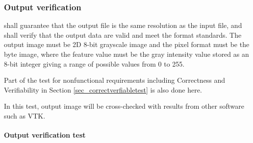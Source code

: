 \documentclass[12pt, titlepage]{article}
\begin{document}
\subsubsection{Output verification} \label{sec_outputverifytest}

\progname{} shall guarantee that the output file is the same resolution as the
input file, and shall verify that the output data are valid and meet the format
standards. The output image must be 2D 8-bit grayscale image and the pixel
format must be the byte image, where the feature value must be the gray
intensity value stored as an 8-bit integer giving a range of possible values
from 0 to 255.

Part of the test for nonfunctional requirements including Correctness and
Verifiability in Section \ref{sec_correctverfiabletest} is also done here.

In this test, output image will be cross-checked with results from other
software such as VTK.
		
\paragraph{Output verification test}
\end{document}
